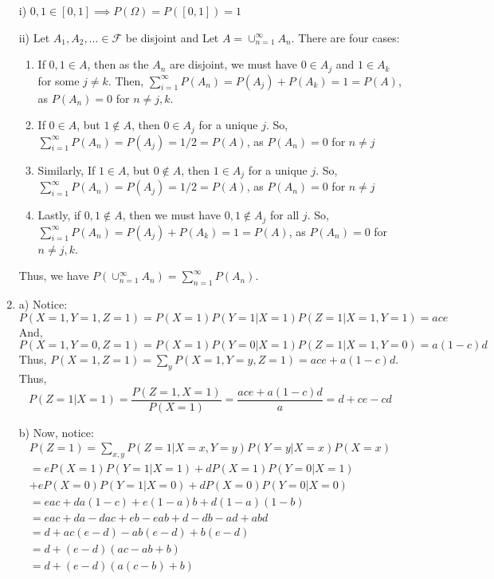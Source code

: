 \documentclass[12pt]{article}
\theoremstyle{plain}
\theoremstyle{definition}
\begin{document}
\begin{enumerate}
i) $0, 1 \in [0,1] \implies P(\Omega) = P([0,1]) = 1$

ii) Let $A_1, A_2, ... \in \mathcal{F}$ be disjoint and Let $A = \cup_{n=1}^{\infty} A_n$. There are four cases:

\begin{enumerate}

\item If $0,1 \in A$, then as the $A_n$ are disjoint, we must have $0 \in A_j$ and $1 \in A_k$ for some $j \neq k$. Then, $\sum_{i=1}^{\infty} P(A_n) = P(A_j) + P(A_k) = 1 = P(A)$, as $P(A_n) = 0$ for $n \neq j,k$. 

\item If $0 \in A$, but $1 \notin A$, then $0\in A_j$ for a unique $j$. So, $\sum_{i=1}^{\infty} P(A_n) = P(A_j) = 1/2 = P(A)$, as $P(A_n) = 0$ for $n \neq j$

\item Similarly, If $1 \in A$, but $0 \notin A$, then $1 \in A_j$ for a unique $j$. So, $\sum_{i=1}^{\infty} P(A_n) = P(A_j) = 1/2 = P(A)$, as $P(A_n) = 0$ for $n \neq j$

\item Lastly, if $0,1 \notin A$, then we must have $0, 1 \notin A_j$ for all $j$. So, $\sum_{i=1}^{\infty} P(A_n) = P(A_j) + P(A_k) = 1 = P(A)$, as $P(A_n) = 0$ for $n \neq j,k$.

\end{enumerate}

Thus, we have $P(\cup_{n=1}^{\infty} A_n) = \sum_{n=1}^{\infty} P(A_n)$. 

\vspace{1pc}

\item
a) Notice: $$ P(X=1, Y=1, Z=1) = P(X=1)P(Y=1|X=1)P(Z=1| X=1, Y=1) = ace$$
And, $$P(X=1, Y=0, Z=1) = P(X=1)P(Y=0 | X=1)P(Z=1| X=1, Y=0) = a(1-c)d$$
Thus, $P(X=1, Z=1) = \sum_y P(X=1, Y = y, Z=1) = ace + a(1-c)d$. Thus, 
$$ P(Z=1 | X=1) = \frac{P(Z=1, X=1)}{P(X=1)} = \frac{ace + a(1-c)d}{a} = d + ce-cd$$

\vspace{2pc}
b) Now, notice:
\begin{align*}
P(Z=1) = \sum_{x, y} P(Z=1 | X=x, Y=y)P(Y=y|X=x)P(X=x) \\
= e P(X=1)P(Y=1|X=1) + dP(X=1)P(Y=0|X=1) \\
+ e P(X=0)P(Y=1|X=0) + dP(X=0)P(Y=0|X=0) \\
= eac + da(1-c) + e(1-a)b + d(1-a)(1-b) \\
= eac + da - dac +eb -eab +d -db -ad +abd \\
= d + ac(e-d) -ab(e-d) + b(e-d) \\
= d + (e-d)(ac - ab + b) \\
= d + (e-d)(a(c-b) +b)
\end{align*}





\end{enumerate}
\end{document}
